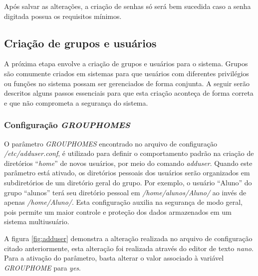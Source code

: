 \documentclass[
  12pt,				%
  oneside,   	        %
  a4paper,			%
  english,			%
  french,				%
  spanish,			%
  brazil,				%
  ]{pacotes/abntex2}
\begin{document}
Após salvar as alterações, a criação de senhas só será bem sucedida caso a senha digitada possua os requisitos mínimos.

\subsection{Criação de grupos e usuários}
\label{subsec:grupos_usuarios}

A próxima etapa envolve a criação de grupos e usuários para o sistema. Grupos são comumente criados em sistemas para que usuários com diferentes privilégios ou funções no sistema possam ser gerenciados de forma conjunta. A seguir serão descritos alguns passos essenciais para que esta criação aconteça de forma correta e que não comprometa a segurança do sistema.

\subsubsection{Configuração \textit{GROUPHOMES}}
O parâmetro \textit{GROUPHOMES} encontrado no arquivo de configuração \textit{/etc/adduser.conf}, é utilizado para definir o comportamento padrão na criação de diretórios ``\textit{home}'' de novos usuários, por meio do comando \textit{adduser}. Quando este parâmetro está ativado, os diretórios pessoais dos usuários serão organizados em subdiretórios de um diretório geral do grupo. Por exemplo, o usuário ``Aluno'' do grupo ``alunos'' terá seu diretório pessoal em \textit{/home/alunos/Aluno/} ao invés de apenas \textit{/home/Aluno/}. Esta configuração auxilia na segurança de modo geral, pois permite um maior controle e proteção dos dados armazenados em um sistema multiusuário.

A figura \ref{fig:adduser} demonstra a alteração realizada no arquivo de configuração citado anteriormente, esta alteração foi realizada através do editor de texto \textit{nano}. Para a ativação do parâmetro, basta alterar o valor associado à variável \textit{GROUPHOME} para \textit{yes}.
\end{document}
